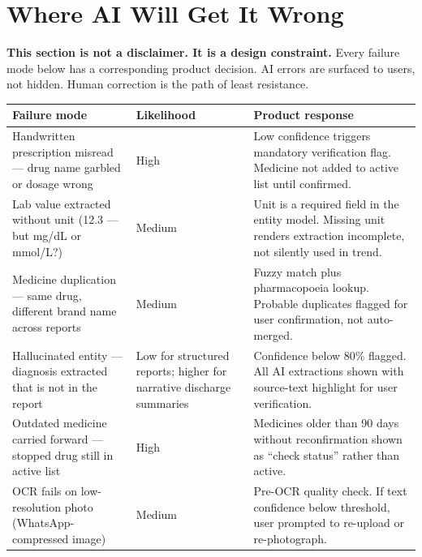\documentclass[11pt, a4paper]{article}
\begin{document}
\section{Where AI Will Get It Wrong}

\begin{warnbox}
\textbf{This section is not a disclaimer. It is a design constraint.} Every failure mode below has a corresponding product decision. AI errors are surfaced to users, not hidden. Human correction is the path of least resistance.
\end{warnbox}

\vspace{6pt}
\begin{tabularx}{\linewidth}{@{}L{4.4cm} L{2.4cm} X@{}}
\toprule
\textbf{Failure mode} & \textbf{Likelihood} & \textbf{Product response} \\
\midrule
Handwritten prescription misread --- drug name garbled or dosage wrong &
High &
Low confidence triggers mandatory verification flag. Medicine not added to active list until confirmed. \\
\addlinespace
Lab value extracted without unit (12.3 --- but mg/dL or mmol/L?) &
Medium &
Unit is a required field in the entity model. Missing unit renders extraction incomplete, not silently used in trend. \\
\addlinespace
Medicine duplication --- same drug, different brand name across reports &
Medium &
Fuzzy match plus pharmacopoeia lookup. Probable duplicates flagged for user confirmation, not auto-merged. \\
\addlinespace
Hallucinated entity --- diagnosis extracted that is not in the report &
Low for structured reports; higher for narrative discharge summaries &
Confidence below 80\% flagged. All AI extractions shown with source-text highlight for user verification. \\
\addlinespace
Outdated medicine carried forward --- stopped drug still in active list &
High &
Medicines older than 90 days without reconfirmation shown as ``check status'' rather than active. \\
\addlinespace
OCR fails on low-resolution photo (WhatsApp-compressed image) &
Medium &
Pre-OCR quality check. If text confidence below threshold, user prompted to re-upload or re-photograph. \\
\bottomrule
\end{tabularx}

\end{document}
